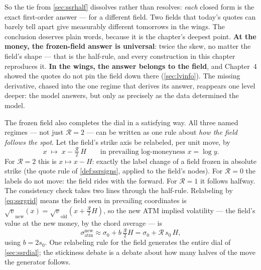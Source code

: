 So the tie from \cref{sec:ssrhalf} dissolves rather than resolves:
\emph{each} closed form is the exact first-order answer --- for a
different field.  Two fields that today's quotes can barely tell apart
give measurably different tomorrows in the wings.  The conclusion
deserves plain words, because it is the chapter's deepest point.
\textbf{At the money, the frozen-field answer is universal}: twice the
skew, no matter the field's shape --- that is the half-rule, and every
construction in this chapter reproduces it.  \textbf{In the wings, the
answer belongs to the field}, and Chapter~4 showed the quotes do not
pin the field down there (\cref{sec:lvinfo}).  The missing derivative, chased into the
one regime that derives its answer, reappears one level deeper: the
model answers, but only as precisely as the data determined the model.

\medskip

The frozen field also completes the dial in a satisfying way.  All
three named regimes --- not just $\mathcal{R}=2$ --- can be written as
one rule about \emph{how the field follows the spot}.  Let the field's
strike axis be relabeled, per unit move, by
\begin{equation}
x\;\longmapsto\;x-\tfrac{\mathcal{R}}{2}\,H
\qquad\text{in prevailing log-moneyness }x=\log y .
\label{eq:ssrgrid}
\end{equation}
For $\mathcal{R}=2$ this is $x\mapsto x-H$: exactly the label change
of a field frozen in absolute strike (the quote rule of
\cref{def:ssrsigns}, applied to the field's nodes).  For
$\mathcal{R}=0$ the labels do not move: the field rides with the
forward.  For $\mathcal{R}=1$ it follows halfway.  The consistency
check takes two lines through the half-rule.  Relabeling by
\eqref{eq:ssrgrid} means the field seen in prevailing coordinates is
$\sqrt{v}_{\mathrm{new}}(x)=\sqrt{v}_{\mathrm{old}}
(x+\tfrac{\mathcal{R}}{2}H)$, so the new ATM implied volatility ---
the field's value at the new money, by the chord average --- is
\[
\sigma_{\mathrm{atm}}^{\mathrm{new}}
\approx\sigma_{0}+b\,\tfrac{\mathcal{R}}{2}H
=\sigma_{0}+\mathcal{R}\,s_0\,H ,
\]
using $b=2s_0$.  One relabeling rule for the field generates the
entire dial of \cref{sec:ssrdial}; the stickiness debate is a debate
about how many halves of the move the generator follows.

\medskip

